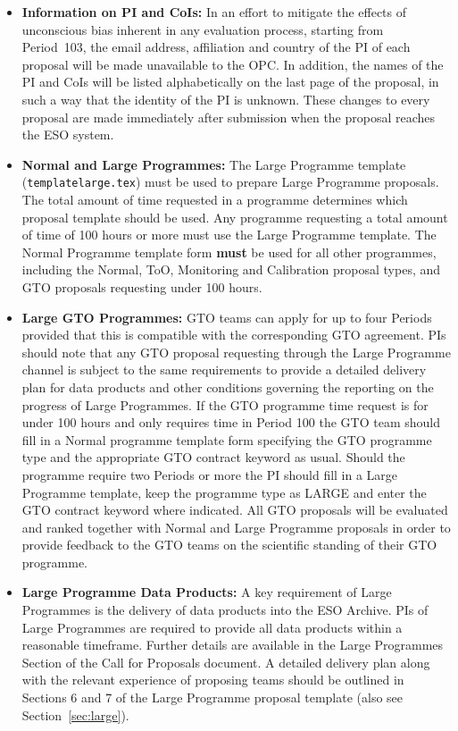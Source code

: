 \documentclass{article}
\begin{document}
\begin{itemize}

\item{\bf Information on PI and CoIs:} In an effort to mitigate the effects of unconscious bias inherent in any evaluation process, starting from Period~103, the email address, affiliation and country of the PI of each proposal will be made unavailable to the OPC. In addition, the names of the PI and CoIs will be listed alphabetically on the last page of the proposal, in such a way that the identity of the PI is unknown. These changes to every proposal are made immediately after submission when the proposal reaches the ESO system.

\item{\bf Normal and Large Programmes:}
The Large Programme template ({\tt templatelarge.tex}) must be used to
prepare Large Programme proposals. The total amount of time requested in a programme determines which proposal template should be used.
Any programme requesting a total amount of time of 100 hours or more
must use the Large Programme template.
The Normal Programme template form {\bf must} be used for all other programmes,
including the Normal, ToO, Monitoring and Calibration proposal types, and GTO proposals
requesting under 100 hours.

\item{\bf Large GTO Programmes:} 
GTO teams can apply for up to four Periods provided that this is compatible with the corresponding GTO agreement.
PIs should note that any GTO proposal requesting through the Large Programme channel is subject to the same requirements to provide a detailed delivery plan for data products and other conditions governing the reporting on the progress of Large Programmes.
If the GTO programme time request is for under 100 hours and only requires time in Period 100 the GTO team should fill in a Normal programme template form specifying the GTO programme type and the appropriate GTO contract keyword as usual. 
Should the programme require two Periods or more the PI should fill in a Large Programme template,
keep the programme type as LARGE and enter the GTO contract keyword where indicated.
All GTO proposals will be evaluated and ranked together with Normal and Large Programme proposals in order to provide feedback to the GTO teams on the scientific standing of their GTO programme.

\item{\bf Large Programme Data Products:}
A key requirement of Large Programmes is the delivery of data products into the ESO Archive. PIs of Large Programmes are required to provide all data products within a reasonable timeframe. Further details are available in the Large Programmes Section of the Call for Proposals document.
A detailed delivery plan along with the relevant experience of proposing teams
should be outlined in Sections 6 and 7 of the Large Programme proposal template
(also see Section~\ref{sec:large}).


\end{itemize}
\end{document}
